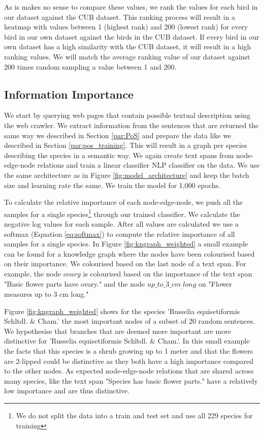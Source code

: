 \documentclass[a4paper, 12pt, oneside]{book} %
\begin{document}
As is makes no sense to compare these values, we rank the values for each bird in our dataset against the CUB dataset.
This ranking process will result in a heatmap with values between 1 (highest rank) and 200 (lowest rank) for every bird in our own dataset against the birds in the CUB dataset.
If every bird in our own dataset has a high similarity with the CUB dataset, it will result in a high ranking values.
We will match the average ranking value of our dataset against 200 times random sampling a value between 1 and 200.


\subsection{Information Importance}
We start by querying web pages that contain possible textual description using the web crawler.
We extract information from the sentences that are returned the same way we described in Section \ref{par:PoS} and prepare the data like we described in Section \ref{par:pos_training}.
This will result in a graph per species describing the species in a semantic way.
We again create text spans from node-edge-node relations and train a linear classifier NLP classifier on the data.
We use the same architecture as in Figure \ref{fig:model_architecture} and keep the batch size and learning rate the same.
We train the model for 1,000 epochs.


To calculate the relative importance of each node-edge-node, we push all the samples for a single species\footnote{We do not split the data into a train and test set and use all 229 species for training} through our trained classifier.
We calculate the negative log values for each sample.
After all values are calculated we use a softmax (Equation \ref{eq:softmax}) to compute the relative importance of all samples for a single species.
In Figure \ref{fig:kngraph_weighted} a small example can be found for a knowledge graph where the nodes have been colourised based on their importance.
We colourised based on the last node of a text span.
For example, the node $ovary$ is colourised based on the importance of the text span "Basic flower parts have ovary." and the node $up\_to\_3\_cm_\_long$ on "Flower measures up to 3 cm long."

Figure \ref{fig:kngraph_weighted} shows for the species 'Russelia equisetiformis Schltdl. \& Cham.' the most important nodes of a subset of 20 random sentences.
We hypothesise that branches that are deemed more important are more distinctive for 'Russelia equisetiformis Schltdl. \& Cham.'.
In this small example the facts that this species is a shrub growing up to 1 meter and that the flowers are 2-lipped could be distinctive as they both have a high importance compared to the other nodes.
As expected node-edge-node relations that are shared across many species, like the text span "Species has basic flower parts." have a relatively low importance and are thus distinctive. 
\end{document}
